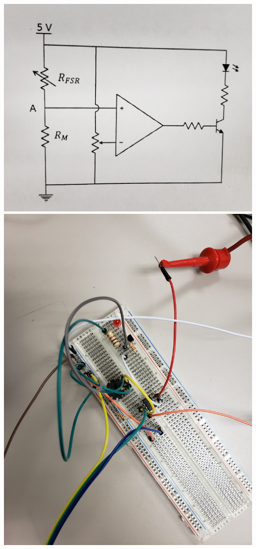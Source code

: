 \documentclass[12pt]{article}
\begin{document}
					\begin{center}
						\includegraphics[scale=0.05]{3.jpg}\\
						\vspace{1cm}
						\includegraphics[scale=0.04]{fsr.jpg}\\
					\end{center}
			
\end{document}
